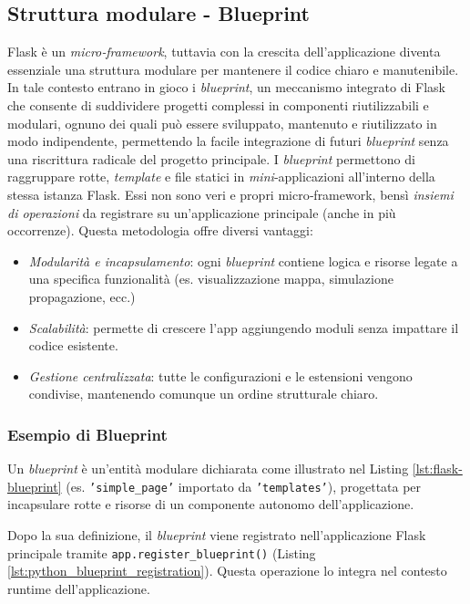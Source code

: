 \subsection{Struttura modulare - Blueprint}
\label{ss:blueprint}

Flask è un \textit{micro‑framework}, tuttavia con la crescita dell'applicazione diventa essenziale una struttura modulare per mantenere il codice chiaro e manutenibile. 
In tale contesto entrano in gioco i \textit{blueprint}, un meccanismo integrato di Flask che consente di suddividere progetti complessi in componenti riutilizzabili e modulari, ognuno dei quali può essere sviluppato, mantenuto e riutilizzato in modo indipendente, permettendo la facile integrazione di futuri \textit{blueprint} senza una riscrittura radicale del progetto principale. 
I \textit{blueprint} permettono di raggruppare rotte, \textit{template} e file statici in \textit{mini}‑applicazioni all'interno della stessa istanza Flask. Essi non sono veri e propri micro‑framework, bensì \textit{insiemi di operazioni} da registrare su un'applicazione principale (anche in più occorrenze). 
Questa metodologia offre diversi vantaggi: \cite{palets_blueprints}

\begin{itemize}
  \item \emph{Modularità e incapsulamento}: ogni \textit{blueprint} contiene logica e risorse legate a una specifica funzionalità (es. visualizzazione mappa, simulazione propagazione, ecc.)
  \item \emph{Scalabilità}: permette di crescere l'app aggiungendo moduli senza impattare il codice esistente.
  \item \emph{Gestione centralizzata}: tutte le configurazioni e le estensioni vengono condivise, mantenendo comunque un ordine strutturale chiaro.
\end{itemize}

\subsubsection{Esempio di Blueprint}

Un \textit{blueprint} è un'entità modulare dichiarata come illustrato nel Listing \ref{lst:flask-blueprint} (es. \texttt{'simple\_page'} importato da \texttt{'templates'}), progettata per incapsulare rotte e risorse di un componente autonomo dell'applicazione.

Dopo la sua definizione, il \textit{blueprint} viene registrato nell'applicazione Flask principale tramite \texttt{app.register\_blueprint()} (Listing \ref{lst:python_blueprint_registration}). Questa operazione lo integra nel contesto runtime dell'applicazione.

